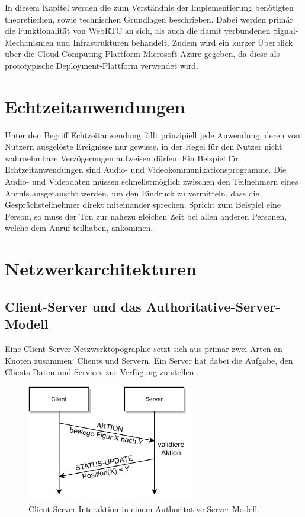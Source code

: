 In diesem Kapitel werden die zum Verständnis der Implementierung benötigten theoretischen, sowie technischen Grundlagen beschrieben. Dabei werden primär die Funktionalität von \acs{WebRTC} an sich, als auch die damit verbundenen Signal-Mechanismen und Infrastrukturen behandelt. Zudem wird ein kurzer Überblick über die Cloud-Computing Plattform Microsoft Azure gegeben, da diese als prototypische Deployment-Plattform verwendet wird.

\section{Echtzeitanwendungen}
Unter den Begriff Echtzeitanwendung fällt prinzipiell jede Anwendung, deren von Nutzern ausgelöste Ereignisse nur gewisse, in der Regel für den Nutzer nicht wahrnehmbare Verzögerungen aufweisen dürfen. Ein Beispiel für Echtzeitanwendungen sind Audio- und Videokommunikationsprogramme. Die Audio- und Videodaten müssen schnellstmöglich zwischen den Teilnehmern eines Anrufs ausgetauscht werden, um den Eindruck zu vermitteln, dass die Gesprächsteilnehmer direkt miteinander sprechen. Spricht zum Beispiel eine Person, so muss der Ton zur nahezu gleichen Zeit bei allen anderen Personen, welche dem Anruf teilhaben, ankommen.

\section{Netzwerkarchitekturen}

\subsection{Client-Server und das Authoritative-Server-Modell}
Eine Client-Server Netzwerktopographie setzt sich aus primär zwei Arten an Knoten zusammen: Clients und Servern. Ein Server hat dabei die Aufgabe, den Clients Daten und Services zur Verfügung zu stellen \cite{silveira2015}.

\begin{figure}[h]
\centering
\includegraphics[width=0.65\textwidth]{bilder/PDF_SVG/AUTH_SERVER.pdf}
\caption{Client-Server Interaktion in einem Authoritative-Server-Modell.}
\end{figure}

